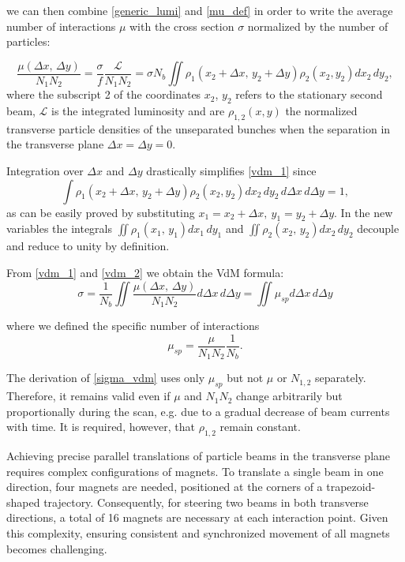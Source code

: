 we can then combine \ref{generic_lumi} and \ref{mu_def} in order to write the average number of interactions $\mu$  with the cross section $\sigma$ normalized by the number of particles:

\begin{equation}
\frac{\mu (\Delta x,\, \Delta y)}{N_1N_2} = \frac{\sigma}{f} \frac{\mathcal{L}}{N_1N_2} = \sigma N_b \iint \rho _1(x_2 + \Delta x,\, y_2 + \Delta y) \rho _2(x_2,y_2) dx_2\, dy_2, \label{vdm_1}
\end{equation}
where the subscript 2 of the coordinates $x_2$, $y_2$ refers to the stationary second beam, $\mathcal{L}$ is the integrated luminosity and are $\rho_{1,2}(x,y)$ the normalized transverse particle densities of the unseparated bunches when the separation in the transverse plane $\Delta x = \Delta y = 0$.

Integration over $\Delta x$ and $\Delta y$ drastically simplifies \eqref{vdm_1} since
\begin{equation} \int \rho _1(x_2 {+} \Delta x,\, y_2 {+} \Delta y) \rho _2(x_2,y_2) dx_2\, dy_2\, d\Delta x\, d\Delta y {=} 1, \label{vdm_2} \end{equation}
as can be easily proved by substituting $x_1=x_2+\Delta x,\ y_1=y_2+\Delta y$. In the new variables the integrals $\iint \rho _1(x_1,\, y_1)dx_1\,dy_1$ and $\iint \rho _2(x_2,\, y_2)dx_2\,dy_2$ decouple and reduce to unity by definition.

From \eqref{vdm_1} and \eqref{vdm_2} we obtain the VdM formula:
\begin{equation}
     \sigma = \frac{1}{N_b} \iint \frac{\mu (\Delta x,\, \Delta y)}{N_1N_2} d\Delta x\, d\Delta y= \iint \mu_{sp}d\Delta x\, d \Delta y \label{sigma_vdm}
    \end{equation}

where we defined the specific number of interactions
\begin{equation}
\mu_{sp}=\frac{\mu}{N_1 N_2}\frac{1}{N_b}.\label{mu_sp}
\end{equation}

The derivation of \eqref{sigma_vdm} uses only $\mu _{sp}$ but not $\mu$ or $N_{1,2}$ separately. Therefore, it remains valid even if $\mu$ and $N_1N_2$ change arbitrarily but proportionally during the scan, e.g. due to a gradual decrease of beam currents with time. It is required, however, that $\rho_{1,2}$ remain constant.

Achieving precise parallel translations of particle beams in the transverse plane requires complex configurations of magnets. To translate a single beam in one direction, four magnets are needed, positioned at the corners of a trapezoid-shaped trajectory. Consequently, for steering two beams in both transverse directions, a total of 16 magnets are necessary at each interaction point. Given this complexity, ensuring consistent and synchronized movement of all magnets becomes challenging.

